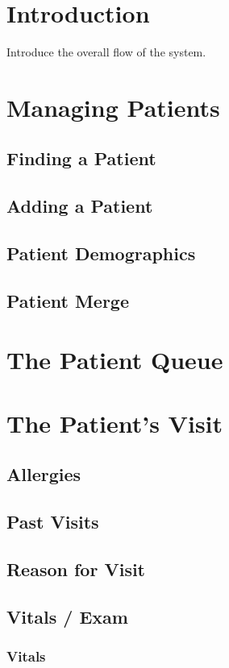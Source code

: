 \section{Introduction}

Introduce the overall flow of the system.

\section{Managing Patients}
\subsection{Finding a Patient}
\subsection{Adding a Patient}
\subsection{Patient Demographics}
\subsection{Patient Merge}

\section{The Patient Queue}

\section{The Patient's Visit}
\subsection{Allergies}
\subsection{Past Visits}
\subsection{Reason for Visit}
\subsection{Vitals / Exam}
\subsubsection{Vitals}
